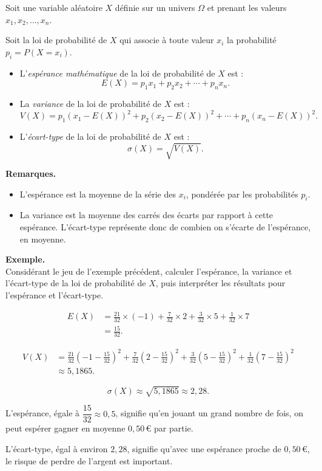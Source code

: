 \documentclass[11pt]{article}
\newenvironment{remarques}{\par\smallskip\noindent\textbf{Remarques. \\}\ignorespaces}{\par\smallskip}
\newenvironment{exemple}{\par\smallskip\noindent\textbf{Exemple. \\}\ignorespaces}{\par\smallskip}
\begin{document}
\begin{definitions}
Soit une variable aléatoire $X$ définie sur un univers $\Omega$ et prenant les valeurs $x_1,x_2,\ldots,x_n$.

Soit la loi de probabilité de $X$ qui associe à toute valeur $x_i$ la probabilité $p_i=P(X=x_i)$.
\begin{itemize}
    \item L'\emph{espérance mathématique} de la loi de probabilité de $X$ est :
    \[
    E(X)=p_1x_1+p_2x_2+\cdots+p_nx_n.
    \]
    \item La \emph{variance} de la loi de probabilité de $X$ est :
    \[
    V(X)=p_1(x_1-E(X))^2+p_2(x_2-E(X))^2+\cdots+p_n(x_n-E(X))^2.
    \]
    \item L'\emph{écart-type} de la loi de probabilité de $X$ est :
    \[
    \sigma(X)=\sqrt{V(X)}.
    \]
\end{itemize}
\end{definitions}

\begin{remarques}
\begin{itemize}
    \item L'espérance est la moyenne de la série des $x_i$, pondérée par les probabilités $p_i$.
    \item La variance est la moyenne des carrés des écarts par rapport à cette espérance. L'écart-type représente donc de combien on s'écarte de l'espérance, en moyenne.
\end{itemize}
\end{remarques}

\begin{exemple}
Considérant le jeu de l'exemple précédent, calculer l'espérance, la variance et l'écart-type de la loi de probabilité de $X$, puis interpréter les résultats pour l'espérance et l'écart-type.

\begin{align*}
E(X)&=\frac{21}{32}\times(-1)+\frac{7}{32}\times2+\frac{3}{32}\times5+\frac{1}{32}\times7\\
&=\frac{15}{32}.
\end{align*}

\begin{align*}
V(X)&=\frac{21}{32}\left(-1-\frac{15}{32}\right)^2
+\frac{7}{32}\left(2-\frac{15}{32}\right)^2
+\frac{3}{32}\left(5-\frac{15}{32}\right)^2
+\frac{1}{32}\left(7-\frac{15}{32}\right)^2\\
&\approx 5{,}1865.
\end{align*}

\[
\sigma(X)\approx\sqrt{5{,}1865}\approx 2{,}28.
\]

L'espérance, égale à $\dfrac{15}{32}\approx 0{,}5$, signifie qu'en jouant un grand nombre de fois, on peut espérer gagner en moyenne $0{,}50\,€$ par partie.

L'écart-type, égal à environ $2{,}28$, signifie qu'avec une espérance proche de $0{,}50\,€$, le risque de perdre de l'argent est important.
\end{exemple}
\end{document}
